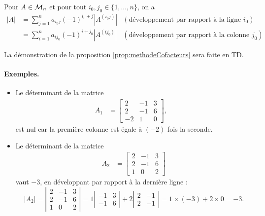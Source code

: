 \begin{proposition} \label{prop:methodeCofacteurs}
  Pour $A \in \mathcal{M}_n$ et pour tout $i_0, j_0 \in \{1, \dots, n\}$, on a 
  \begin{align*}
    |A| 
    & = \sum_{j=1}^n a_{i_0j} (-1)^{i_0+j} |A^{(i_0j)}| & (\text{développement par rapport à la ligne $i_0$}) \\
    & = \sum_{i=1}^n a_{ij_0} (-1)^{i+j_0} |A^{(ij_0)}| & (\text{développement par rapport à la colonne $j_0$})
  \end{align*}
\end{proposition}

La démonstration de la proposition \ref{prop:methodeCofacteurs} sera faite en TD. \eproof

\paragraph*{Exemples.}
\begin{itemize}
  \item Le déterminant de la matrice 
  \begin{align*}
    A_1 & = \left[\begin{array}{rrr}
      2 & -1 & 3 \\ 2 & -1 & 6 \\ -2 & 1 & 0
      \end{array}\right], &
  \end{align*}
  est nul car la première colonne est égale à $(-2)$ fois la seconde.
  \item Le déterminant de la matrice
  \begin{align*}
    A_2 & = \left[\begin{array}{rrr}
      2 & -1 & 3 \\ 2 & -1 & 6 \\ 1 & 0  & 2
      \end{array}\right]
  \end{align*}
  vaut $-3$, en développant par rapport à la dernière ligne :
  $$
  |A_2|
  = \left|\begin{array}{rrr}
    2 & -1 & 3 \\ 2 & -1 & 6 \\ 1 & 0  & 2
    \end{array}\right|
  = 1 \left|\begin{array}{rr} -1 & 3 \\ -1 & 6 \end{array}\right|
  + 2 \left|\begin{array}{rr} 2 & -1 \\ 2 & -1 \end{array}\right|
  = 1 \times (-3) + 2 \times 0 = -3.
  $$
\end{itemize}


